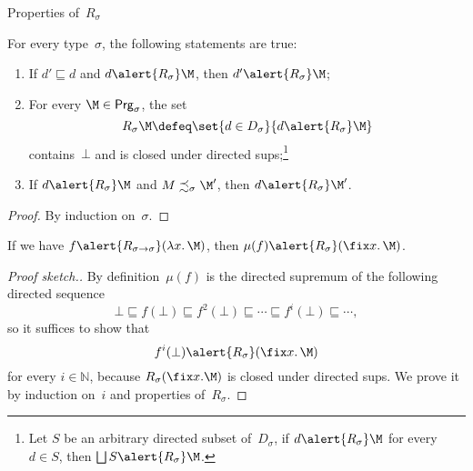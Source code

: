 \begin{frame}{Properties of~$R_\sigma$}
\begin{lemma}
  \label{lem:property_logical_relation}
  For every type~$\sigma$, the following statements are true:
  \begin{enumerate}
    \item If $d' \sqsubseteq d$ and $d\alert{\mathrel{R_\sigma}}\M$, then
      $d' \alert{\mathrel{R_\sigma}} \M$; 
    \item For every $\M \in \mathsf{Prg}_\sigma$, the set
      \[
        R_\sigma \M \defeq \set{ d \in D_\sigma}{ d \alert{\mathrel{R_\sigma}}
          \M}
      \]
      contains~$\bot$ and is closed under directed sups;\footnote{
        Let $S$ be an arbitrary directed subset of~$D_\sigma$, 
        if $d \alert{\mathrel{R_\sigma}} \M$ for every~$d \in S$, then 
        $\bigsqcup S \alert{\mathrel{R_\sigma}} \M$. 
      }
    \item If $d \alert{\mathrel{R_\sigma}} \M$ and $M \precsim_\sigma \M'$, then
      $d \alert{\mathrel{R_\sigma}} \M'$. 
  \end{enumerate}
\end{lemma}
\begin{proof}
  By induction on~$\sigma$.
\end{proof}
\end{frame}

\begin{frame}
  \begin{lemma}
    If we have $f \alert{\mathrel{R_{\sigma\to\sigma}}} (\lambda x.\, \M)$, then
    $\mu(f) \alert{\mathrel{R_\sigma}} (\fix x.\, \M)$. 
  \end{lemma}
\begin{proof}[Proof sketch.]
  By definition~$\mu(f)$ is the directed supremum  of
  the following directed sequence 
  \[
    \bot \sqsubseteq f(\bot) \sqsubseteq f^2(\bot)
    \sqsubseteq \cdots \sqsubseteq f^i(\bot) \sqsubseteq
    \cdots, 
  \]
  so it suffices to show that
  \[
    f^i(\bot) \alert{\mathrel{R_\sigma}} (\fix x.\, \M)
  \]
  for every $i \in \mathbb{N}$, because $R_\sigma(\fix x.\M)$ is closed under
  directed sups. We prove it by induction on~$i$ and properties of~$R_\sigma$.
\end{proof}
\end{frame}

